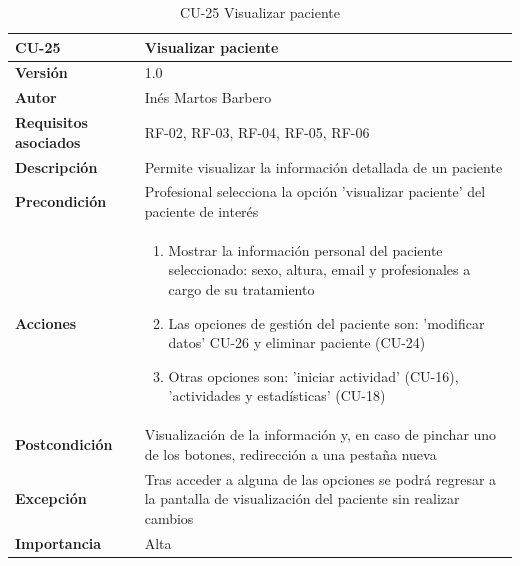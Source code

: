 \begin{table}[p]
	\centering
	\begin{tabularx}{\linewidth}{ p{} p{} }
		\toprule
		\textbf{CU-25}    & \textbf{Visualizar paciente}\\
		\toprule
		\textbf{Versión}              & 1.0    \\
		\textbf{Autor}                & Inés Martos Barbero \\
		\textbf{Requisitos asociados} & RF-02, RF-03, RF-04, RF-05, RF-06 \\
		\textbf{Descripción}          & Permite visualizar la información detallada de un paciente \\
		\textbf{Precondición}         & Profesional selecciona la opción 'visualizar paciente' del paciente de interés \\
		\textbf{Acciones}             &
		\begin{enumerate}
			\def\labelenumi{\arabic{enumi}.}
			\tightlist
			\item Mostrar la información personal del paciente seleccionado: sexo, altura, email y profesionales a cargo de su tratamiento
            \item Las opciones de gestión del paciente son: 'modificar datos' CU-26 y eliminar paciente (CU-24)
			\item Otras opciones son: 'iniciar actividad' (CU-16), 'actividades y estadísticas' (CU-18)
		\end{enumerate}\\
		\textbf{Postcondición}        & Visualización de la información y, en caso de pinchar uno de los botones, redirección a una pestaña nueva \\
		\textbf{Excepción}          & Tras acceder a alguna de las opciones se podrá regresar a la pantalla de visualización del paciente sin realizar cambios \\
		\textbf{Importancia}          & Alta \\
		\bottomrule
	\end{tabularx}
	\caption{CU-25 Visualizar paciente}
    \label{CU-25}
\end{table}

